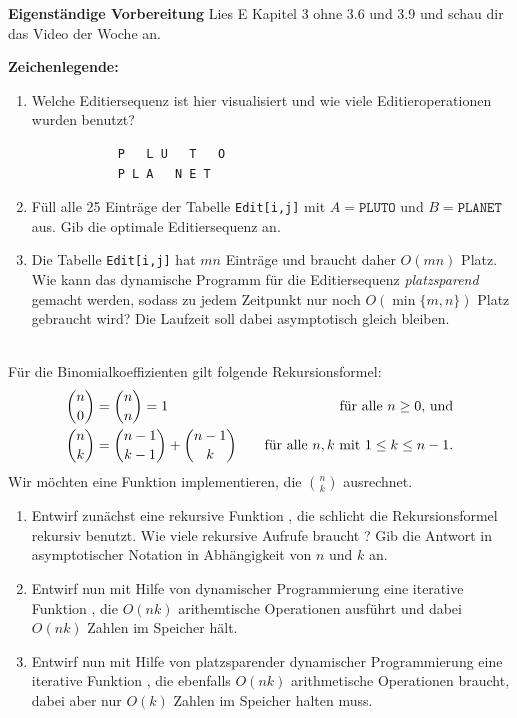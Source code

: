\documentclass{uebung_cs}
\begin{document}
\textbf{Eigenständige Vorbereitung}
Lies  E Kapitel 3 ohne 3.6 und 3.9 und schau dir das  Video der Woche an.

\textbf{Zeichenlegende:}
\legende{}


\begin{aufgabe}[Editieren]\mbox{}
    \begin{enumerate}
        \item\bestehen Welche Editiersequenz ist hier visualisiert und wie viele Editieroperationen wurden benutzt?
        \begin{verbatim}
            P   L U   T   O
            P L A   N E T
        \end{verbatim}
        \item\bestehen Füll alle 25 Einträge der Tabelle \texttt{Edit[i,j]} mit $A=\texttt{PLUTO}$ und $B=\texttt{PLANET}$ aus. Gib die optimale Editiersequenz an.
        \item\mittel Die Tabelle \texttt{Edit[i,j]} hat $mn$ Einträge und braucht daher $O(mn)$ Platz. Wie kann das dynamische Programm für die Editiersequenz \emph{platzsparend} gemacht werden, sodass zu jedem Zeitpunkt nur noch ${O(\min\{m,n\})}$ Platz gebraucht wird? Die Laufzeit soll dabei asymptotisch gleich bleiben.
    \end{enumerate}
\end{aufgabe}

\begin{aufgabe}\mbox{}\\
    Für die Binomialkoeffizienten gilt folgende Rekursionsformel:
    \begin{align*}
        \binom{n}{0}&=\binom{n}{n}=1&\quad\text{für alle $n\ge 0$, und}\\
        \binom{n}{k}&=\binom{n-1}{k-1}+\binom{n-1}{k}&\quad\text{für alle $n,k$ mit $ 1\le k \le n-1$.}
    \end{align*}
    Wir möchten eine Funktion implementieren, die $\binom{n}{k}$ ausrechnet.
    \begin{enumerate}
        \item\bestehen Entwirf zunächst eine rekursive Funktion , die schlicht die Rekursionsformel rekursiv benutzt. Wie viele rekursive Aufrufe braucht ? Gib die Antwort in asymptotischer Notation in Abhängigkeit von $n$ und $k$ an.
        \item\bestehen Entwirf nun mit Hilfe von dynamischer Programmierung eine iterative Funktion , die $O(nk)$ arithemtische Operationen ausführt und dabei $O(nk)$ Zahlen im Speicher hält.
        \item\mittel Entwirf nun mit Hilfe von platzsparender dynamischer Programmierung eine iterative Funktion , die ebenfalls $O(nk)$ arithmetische Operationen braucht, dabei aber nur $O(k)$ Zahlen im Speicher halten muss.
    \end{enumerate}
\end{aufgabe}
\end{document}
